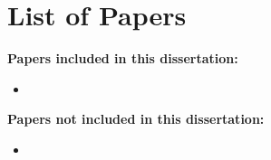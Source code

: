 \chapter*{List of Papers}
\thispagestyle{empty}

\vspace{2cm}
\noindent\textbf{Papers included in this dissertation:}

\begin{itemize}
    \item 
\end{itemize}
\vspace{0.5cm}
\textbf{Papers not included in this dissertation:}

\begin{itemize}
    \item 
\end{itemize}
\newpage
\pagestyle{empty}
\section*{}